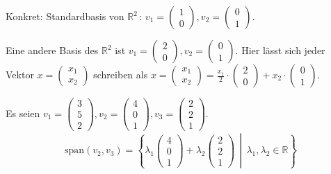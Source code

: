 Konkret: Standardbasis von $\mathbb{R}^2\,:\,v_1=\begin{pmatrix}1\\0\end{pmatrix},v_2=\begin{pmatrix}0\\1\end{pmatrix}$.

Eine andere Basis des $\mathbb{R}^2$ ist $v_1=\begin{pmatrix}2\\0\end{pmatrix},v_2=\begin{pmatrix}0\\1\end{pmatrix}$. Hier lässt sich jeder Vektor $x = \begin{pmatrix}x_1\\x_2\end{pmatrix}$ schreiben als $x = \begin{pmatrix}x_1\\x_2\end{pmatrix} = \frac{x_1}{2}\cdot\begin{pmatrix}2\\0\end{pmatrix} + x_2 \cdot\begin{pmatrix}0\\1\end{pmatrix}$.

Es seien $v_1 = \begin{pmatrix}3\\5\\2\end{pmatrix}, v_2 = \begin{pmatrix}4\\0\\1\end{pmatrix}, v_3 = \begin{pmatrix}2\\2\\1\end{pmatrix}$.
\begin{align*}
	\text{span}(v_2, v_3) = \left\{\lambda _1 \begin{pmatrix}4\\0\\1\end{pmatrix} + \lambda _2 \begin{pmatrix}2\\2\\1\end{pmatrix} \,\middle|\, \lambda _1, \lambda _2 \in \mathbb{R} \right\}
\end{align*}

